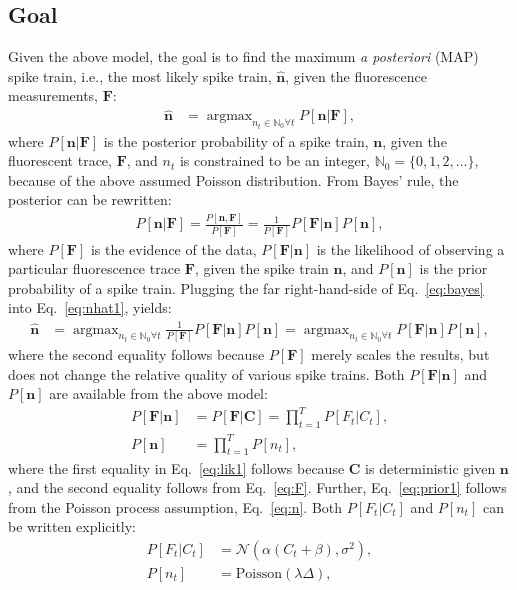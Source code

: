 \documentclass{article}
\providecommand{\ve}[1]{\boldsymbol{#1}}
\DeclareMathOperator*{\argmax}{argmax}
\newcommand{\bn}{\ve{n}}
\newcommand{\bC}{\ve{C}}
\newcommand{\bF}{\ve{F}}
\newcommand{\hbn}{\widehat{\ve{n}}}
\newcommand{\mN}{\mathcal{N}}
\newcommand{\Del}{\Delta}
\newcommand{\sig}{\sigma}
\newcommand{\lam}{\lambda}
\newcommand{\anx}{\argmax_{n_t \in \mathbb{N}_0 \forall t}}
\begin{document}
\subsection{Goal} \label{sec:goal}

Given the above model, the goal is to find the maximum \emph{a posteriori} (MAP) spike train, i.e.,  the most likely spike train, $\hbn$,  given the fluorescence measurements, $\bF$:
\begin{align} \label{eq:nhat1} 
\hbn &=  \anx P[\bn | \bF], 
\end{align}
\noindent where $P[\bn | \bF]$ is the posterior probability of a spike train, $\bn$, given the fluorescent trace, $\bF$, and $n_t$ is constrained to be an integer, $\mathbb{N}_0=\{0,1,2,\ldots\}$, because of the above assumed Poisson distribution.  From Bayes' rule, the posterior can be rewritten:
\begin{align} \label{eq:bayes}
P[\bn | \bF] = \frac{P[\bn, \bF]}{P[\bF]} = \frac{1}{P[\bF]} P[\bF | \bn] P[\bn],
\end{align}
\noindent where $P[\bF]$ is the evidence of the data, $P[\bF | \bn]$ is the likelihood of observing a particular fluorescence trace $\bF$, given the spike train $\bn$, and $P[\bn]$ is the prior probability of a spike train.  Plugging the far right-hand-side of Eq.~\eqref{eq:bayes} into Eq.~\eqref{eq:nhat1}, yields:
\begin{align} \label{eq:nhat2} 
\hbn &=  \anx \frac{1}{P[\bF]} P[\bF | \bn] P[\bn] =  \anx  P[\bF | \bn] P[\bn],
\end{align}
\noindent where the second equality follows because $P[\bF]$ merely scales the results, but does not change the relative quality of various spike trains.  Both $P[\bF | \bn]$ and $P[\bn]$ are available from the above model:
\begin{subequations} \label{eq:post1}
\begin{align}
P[\bF | \bn]&= P[\bF | \bC] 	= \prod_{t=1}^T P[F_t | C_t], \label{eq:lik1} \\ 
P[\bn] 		&= \prod_{t=1}^T P[n_t], \label{eq:prior1}
\end{align}
\end{subequations}
\noindent where the first equality in Eq.~\eqref{eq:lik1} follows because $\bC$ is deterministic given $\bn$, and the second equality follows from Eq.~\eqref{eq:F}. Further, Eq.~\eqref{eq:prior1} follows from the Poisson process assumption, Eq.~\eqref{eq:n}.  Both $P[F_t | C_t]$ and $P[n_t]$ can be written explicitly:
\begin{subequations} \label{eq:post2}
\begin{align}
P[F_t | C_t] &= \mN(\alpha(C_t+\beta),\sig^2), \label{eq:lik2} \\
P[n_t] &= \text{Poisson}(\lam \Del), \label{eq:prior2} 
\end{align}
\end{subequations}
\end{document}
